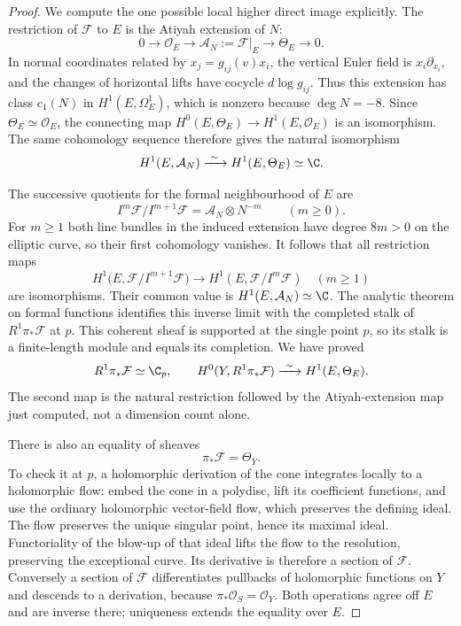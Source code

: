 \begin{proof}
We compute the one possible local higher direct image explicitly.
The restriction of $\mathcal F$ to $E$ is the Atiyah extension
of $N$:
\[
 0\longrightarrow\mathcal O_E
 \longrightarrow\mathcal A_N:=\mathcal F|_E
 \longrightarrow\Theta_E\longrightarrow0.
\]
In normal coordinates related by $x_j=g_{ij}(v)x_i$, the
vertical Euler field is $x_i\partial_{x_i}$, and the changes of
horizontal lifts have cocycle $d\log g_{ij}$.
Thus this extension has class $c_1(N)$ in
$H^1(E,\Omega^1_E)$, which is nonzero because $\deg N=-8$.
Since $\Theta_E\simeq\mathcal O_E$, the connecting map
$H^0(E,\Theta_E)\to H^1(E,\mathcal O_E)$ is an isomorphism.
The same cohomology sequence therefore gives the natural
isomorphism
\[
 H^1(E,\mathcal A_N)\xrightarrow{\ \sim\ }
 H^1(E,\Theta_E)\simeq\C.
\]

The successive quotients for the formal neighbourhood of $E$ are
\[
 I^m\mathcal F/I^{m+1}\mathcal F
     =\mathcal A_N\otimes N^{-m}\qquad(m\ge0).
\]
For $m\ge1$ both line bundles in the induced extension have
degree $8m>0$ on the elliptic curve, so their first cohomology
vanishes.  It follows that all restriction maps
\[
 H^1\bigl(E,\mathcal F/I^{m+1}\mathcal F\bigr)
 \longrightarrow H^1(E,\mathcal F/I^m\mathcal F)
 \quad(m\ge1)
\]
are isomorphisms.  Their common value is
$H^1(E,\mathcal A_N)\simeq\C$.
The analytic theorem on formal functions
\citep[Section~6, Hauptsatz~IIa, p.~59]{Grauert1960D}
identifies this inverse limit with the completed stalk of
$R^1\pi_*\mathcal F$ at $p$.
This coherent sheaf is supported at the single point $p$,
so its stalk is a finite-length module and equals its completion.
We have proved
\[
 R^1\pi_*\mathcal F\simeq\C_p,
 \qquad
 H^0(Y,R^1\pi_*\mathcal F)
    \xrightarrow{\ \sim\ }H^1(E,\Theta_E).
\]
The second map is the natural restriction followed by the
Atiyah-extension map just computed, not a dimension count alone.

There is also an equality of sheaves
\[
 \pi_*\mathcal F=\Theta_Y.
\]
To check it at $p$, a holomorphic derivation of the cone
integrates locally to a holomorphic flow: embed the cone in a
polydisc, lift its coefficient functions, and use the ordinary
holomorphic vector-field flow, which preserves the defining ideal.
The flow preserves the unique singular point, hence its maximal
ideal.  Functoriality of the blow-up of that ideal lifts the flow
to the resolution, preserving the exceptional curve.
Its derivative is therefore a section of $\mathcal F$.
Conversely a section of $\mathcal F$ differentiates pullbacks
of holomorphic functions on $Y$ and descends to a derivation,
because $\pi_*\mathcal O_S=\mathcal O_Y$.
Both operations agree off $E$ and are inverse there; uniqueness
extends the equality over $E$.


\end{proof}
